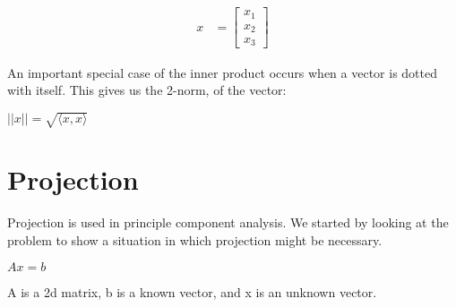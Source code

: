 \begin{center}
	\begin{minipage}[c]{0.35\textwidth}
		\begin{align*}
			x &= \begin{bmatrix} x_1 \\ x_2 \\ x_3 \end{bmatrix}
		\end{align*}
	\end{minipage}
	\hfill
	\begin{minipage}[c]{0.6\textwidth}
	\end{minipage}
\end{center}

An important special case of the inner product occurs when a vector is dotted 
with itself. This gives us the 2-norm, of the vector:

\vspace{0.8em} 

$||x|| = \sqrt{\langle x,x \rangle}$


\section{Projection}

Projection is used in principle component analysis. We started by looking at the problem to show a situation in which projection might be necessary.

$Ax=b$

A is a 2d matrix, b is a known vector, and x is an unknown vector.


